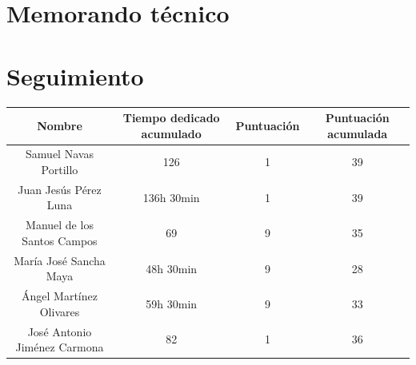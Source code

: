 \documentclass[11 pt]{book}
\begin{document}
	\section{Memorando técnico}
		
		
	\section{Seguimiento}
		\begin{tabular}{|c|c|c|c|}
			\hline
			Nombre & Tiempo dedicado acumulado & Puntuación & Puntuación acumulada\\
			\hline
			Samuel Navas Portillo & 126 & 1 & 39\\
			Juan Jesús Pérez Luna & 136h 30min & 1 & 39\\
			Manuel de los Santos Campos & 69 & 9 & 35\\
			María José Sancha Maya & 48h 30min & 9 & 28\\
			Ángel Martínez Olivares & 59h 30min & 9 & 33\\
			José Antonio Jiménez Carmona & 82 & 1 & 36\\
			\hline
		\end{tabular}
\end{document}
